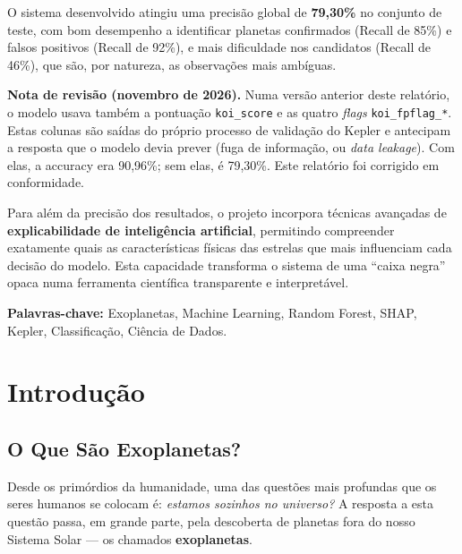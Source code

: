\documentclass[12pt, a4paper]{report}
\begin{document}
O sistema desenvolvido atingiu uma precisão global de \textbf{79,30\%} no conjunto de teste, com bom desempenho a identificar planetas confirmados (Recall de 85\%) e falsos positivos (Recall de 92\%), e mais dificuldade nos candidatos (Recall de 46\%), que são, por natureza, as observações mais ambíguas.

\begin{caixaatencao}
\textbf{Nota de revisão (novembro de 2026).} Numa versão anterior deste relatório, o modelo usava também a pontuação \texttt{koi\_score} e as quatro \textit{flags} \texttt{koi\_fpflag\_*}. Estas colunas são saídas do próprio processo de validação do Kepler e antecipam a resposta que o modelo devia prever (fuga de informação, ou \textit{data leakage}). Com elas, a accuracy era 90,96\%; sem elas, é 79,30\%. Este relatório foi corrigido em conformidade.
\end{caixaatencao}

Para além da precisão dos resultados, o projeto incorpora técnicas avançadas de \textbf{explicabilidade de inteligência artificial}, permitindo compreender exatamente quais as características físicas das estrelas que mais influenciam cada decisão do modelo. Esta capacidade transforma o sistema de uma ``caixa negra'' opaca numa ferramenta científica transparente e interpretável.

\vspace{0.5cm}
\textbf{Palavras-chave:} Exoplanetas, Machine Learning, Random Forest, SHAP, Kepler, Classificação, Ciência de Dados.

\newpage

\tableofcontents
\newpage

\chapter{Introdução}

\section{O Que São Exoplanetas?}

Desde os primórdios da humanidade, uma das questões mais profundas que os seres humanos se colocam é: \textit{estamos sozinhos no universo?} A resposta a esta questão passa, em grande parte, pela descoberta de planetas fora do nosso Sistema Solar — os chamados \textbf{exoplanetas}.
\end{document}
